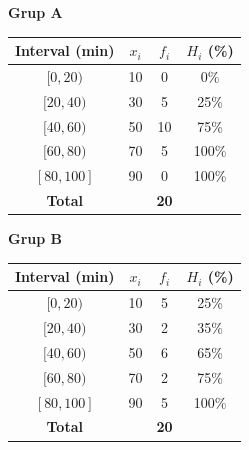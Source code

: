 \documentclass[12pt,a4paper]{article}
\begin{document}
\begin{minipage}{0.48\textwidth}
    \textbf{Grup A}
    \begin{center}
    \renewcommand{\arraystretch}{1.2}
    \begin{tabular}{|c|c|c|c|}
        \hline
        \textbf{Interval (min)} & \textbf{$x_i$} & \textbf{$f_i$} & \textbf{$H_i$ (\%)} \\ \hline
        $[0, 20)$   & 10 & 0 & 0\% \\ \hline
        $[20, 40)$  & 30 & 5 & 25\% \\ \hline
        $[40, 60)$  & 50 & 10 & 75\% \\ \hline
        $[60, 80)$  & 70 & 5 & 100\% \\ \hline
        $[80, 100]$ & 90 & 0 & 100\% \\ \hline
        \textbf{Total} & & \textbf{20} & \\ \hline
    \end{tabular}
    \end{center}
\end{minipage}
\hfill
\begin{minipage}{0.48\textwidth}
    \textbf{Grup B}
    \begin{center}
    \renewcommand{\arraystretch}{1.2}
    \begin{tabular}{|c|c|c|c|}
        \hline
        \textbf{Interval (min)} & \textbf{$x_i$} & \textbf{$f_i$} & \textbf{$H_i$ (\%)} \\ \hline
        $[0, 20)$   & 10 & 5 & 25\% \\ \hline
        $[20, 40)$  & 30 & 2 & 35\% \\ \hline
        $[40, 60)$  & 50 & 6 & 65\% \\ \hline
        $[60, 80)$  & 70 & 2 & 75\% \\ \hline
        $[80, 100]$ & 90 & 5 & 100\% \\ \hline
        \textbf{Total} & & \textbf{20} & \\ \hline
    \end{tabular}
    \end{center}
\end{minipage}
\end{document}
